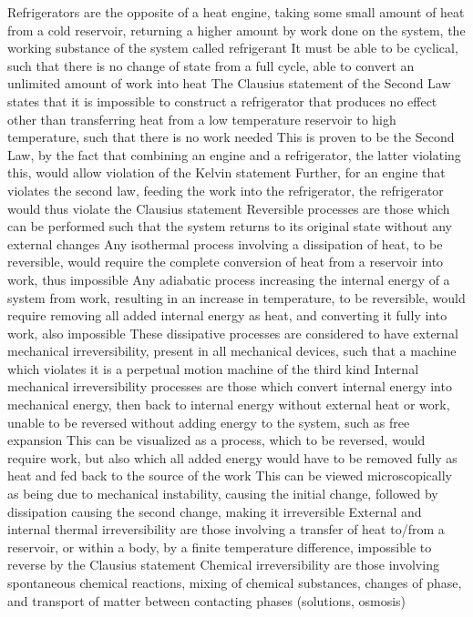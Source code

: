 \documentclass[11 pt, twoside]{article}
\newenvironment{outline*}
{
	\begin{outline}[enumerate]
	}
	{\end{outline}
}
\begin{document}
\begin{outline*}
\1 Refrigerators are the opposite of a heat engine, taking some small amount of heat from a cold reservoir, returning a higher amount by work done on the system, the working substance of the system called refrigerant
\2 It must be able to be cyclical, such that there is no change of state from a full cycle, able to convert an unlimited amount of work into heat
\2 The Clausius statement of the Second Law states that it is impossible to construct a refrigerator that produces no effect other than transferring heat from a low temperature reservoir to high temperature, such that there is no work needed
\3 This is proven to be the Second Law, by the fact that combining an engine and a refrigerator, the latter violating this, would allow violation of the Kelvin statement
\3 Further, for an engine that violates the second law, feeding the work into the refrigerator, the refrigerator would thus violate the Clausius statement
\1 Reversible processes are those which can be performed such that the system returns to its original state without any external changes
\2 Any isothermal process involving a dissipation of heat, to be reversible, would require the complete conversion of heat from a reservoir into work, thus impossible
\3 Any adiabatic process increasing the internal energy of a system from work, resulting in an increase in temperature, to be reversible, would require removing all added internal energy as heat, and converting it fully into work, also impossible
\3 These dissipative processes are considered to have external mechanical irreversibility, present in all mechanical devices, such that a machine which violates it is a perpetual motion machine of the third kind
\2 Internal mechanical irreversibility processes are those which convert internal energy into mechanical energy, then back to internal energy without external heat or work, unable to be reversed without adding energy to the system, such as free expansion
\3 This can be visualized as a process, which to be reversed, would require work, but also which all added energy would have to be removed fully as heat and fed back to the source of the work
\3 This can be viewed microscopically as being due to mechanical instability, causing the initial change, followed by dissipation causing the second change, making it irreversible
\2 External and internal thermal irreversibility are those involving a transfer of heat to/from a reservoir, or within a body, by a finite temperature difference, impossible to reverse by the Clausius statement
\2 Chemical irreversibility are those involving spontaneous chemical reactions, mixing of chemical substances, changes of phase, and transport of matter between contacting phases (solutions, osmosis)

\end{outline*}
\end{document}
